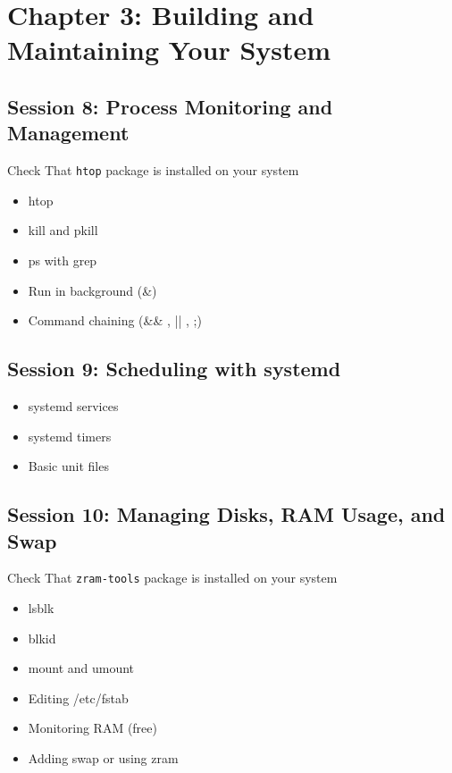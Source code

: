 \documentclass[12pt]{article}
\begin{document}
\section*{Chapter 3: Building and Maintaining Your System}

\subsection*{Session 8: Process Monitoring and Management}
\begin{warningbox}
Check That \texttt{htop} package is installed on your system
\end{warningbox}

\begin{itemize}
    \item htop
    \item kill and pkill
    \item ps with grep
    \item Run in background (\&)
    \item Command chaining (\&\& , || , ;)
\end{itemize}

\subsection*{Session 9: Scheduling with systemd}
\begin{itemize}
    \item systemd services
    \item systemd timers
    \item Basic unit files
\end{itemize}

\subsection*{Session 10: Managing Disks, RAM Usage, and Swap}
\begin{warningbox}
Check That \texttt{zram-tools} package is installed on your system
\end{warningbox}

\begin{itemize}
    \item lsblk
    \item blkid
    \item mount and umount
    \item Editing /etc/fstab
    \item Monitoring RAM (free)
    \item Adding swap or using zram
\end{itemize}
\end{document}
